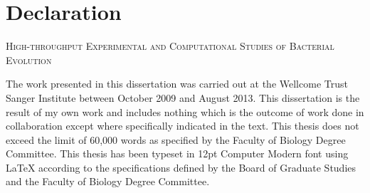 
\chapter{Declaration}

%
\begin{center}
	\textsc{High-throughput Experimental and Computational Studies of Bacterial Evolution}
\end{center}

The work presented in this dissertation was carried out at the Wellcome Trust Sanger Institute between October 2009 and August 2013. This dissertation is the result of my own work and includes nothing which is the outcome of work done in collaboration except where specifically indicated in the text. This thesis does not exceed the limit of 60,000 words as specified by the Faculty of Biology Degree Committee. This thesis has been typeset in 12pt Computer Modern font using \LaTeX{} according to the specifications defined by the Board of Graduate Studies and the Faculty of Biology Degree Committee.
%


